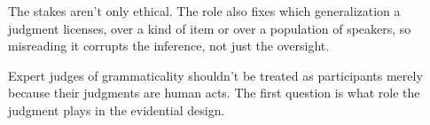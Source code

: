 The stakes aren't only ethical. The role also fixes which generalization a judgment licenses, over a kind of item or over a population of speakers, so misreading it corrupts the inference, not just the oversight.

Expert judges of grammaticality shouldn't be treated as participants merely because their judgments are human acts. The first question is what role the judgment plays in the evidential design.
